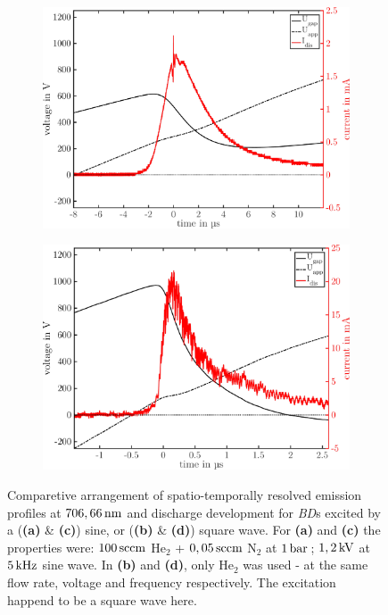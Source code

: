 \documentclass[a4paper,10pt,twoside]{article}
\newcommand{\tilt}[1]{\textit{#1}}
\newcommand{\fett}[1]{\textbf{#1}}
\begin{document}
\begin{figure}
					\begin{subfigure}[t]{0.49\textwidth}
						\includegraphics[width=\textwidth]{figures/706nm@sine/current_dis.pdf}
						\caption{}
						\label{img:emissionsquare}
					\end{subfigure}
					\hfill
					\begin{subfigure}[t]{0.49\textwidth}
						\includegraphics[width=\textwidth]{figures/706nm@square/current_dis.pdf}
						\caption{}
						\label{img:currentsquare}
					\end{subfigure}
					\caption{Comparetive arrangement of spatio-temporally resolved emission profiles at $\unit[706,66]{nm}$ and discharge development for \tilt{BD}s excited by a (\fett{(a)} \& \fett{(c)}) sine, or (\fett{(b)} \& \fett{(d)}) square wave. For \fett{(a)} and \fett{(c)} the properties were: $\unit[100]{sccm}$ He$_2$ + $\unit[0,05]{sccm}$ N$_2$ at $\unit[1]{bar}$\,; $\unit[1,2]{kV}$ at $\unit[5]{kHz}$ sine wave. In \fett{(b)} and \fett{(d)}, only He$_2$ was used - at the same flow rate, voltage and frequency respectively. The excitation happend to be a square wave here.}
					\label{img:comparisonsinesquare}
				\end{figure}
				
\end{document}
